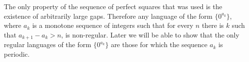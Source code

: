 
The only property of the sequence of perfect squares that was used is the existence of arbitrarily large gaps.
Therefore any language of the form $\{0^{a_k}\}$,
where $a_k$ is a monotone sequence of integers such that for every $n$ there is $k$ such that $a_{k+1} - a_k > n$, is non-regular.
Later we will be able to show that the only regular languages of the form $\{0^{a_k}\}$ are those for which the sequence $a_k$ is periodic.
